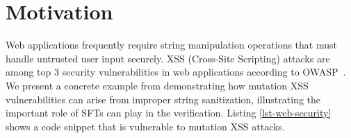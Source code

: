 \section{Motivation}
\label{sec:motivation}

Web applications frequently require string manipulation operations that must handle untrusted user input securely.
XSS (Cross-Site Scripting) attacks are among top 3 security vulnerabilities in web applications according to OWASP~\cite{owasp-top10}.
We present a concrete example from \cite{LB16} demonstrating how mutation XSS vulnerabilities can arise from improper string sanitization, illustrating the important role of SFTs
can play in the verification.
Listing \ref{lst-web-security} shows a code snippet that is vulnerable to mutation XSS attacks.














